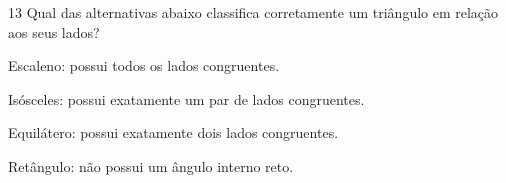 





\pagebreak

\num{13} Qual das alternativas abaixo classifica corretamente um triângulo em
relação aos seus lados?

\begin{escolha}
\item Escaleno: possui todos os lados congruentes.
\item Isósceles: possui exatamente um par de lados congruentes.
\item Equilátero: possui exatamente dois lados congruentes.
\item Retângulo: não possui um ângulo interno reto.
\end{escolha}






